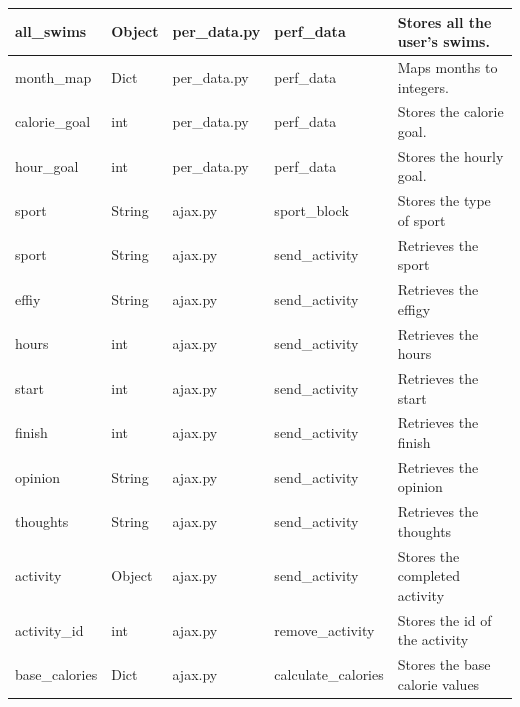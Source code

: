 \documentclass{article}[12pt,a4paper]
\begin{document}
\begin{table}[h]
\begin{tabular}{lllll}
all\_swims        & Object        & per\_data.py        & perf\_data              & Stores all the user's swims.            \\ \hline
month\_map        & Dict          & per\_data.py        & perf\_data              & Maps months to integers.                \\ \hline
calorie\_goal     & int           & per\_data.py        & perf\_data              & Stores the calorie goal.                \\ \hline
hour\_goal        & int           & per\_data.py        & perf\_data              & Stores the hourly goal.                 \\ \hline
sport             & String        & ajax.py             & sport\_block            & Stores the type of sport                \\ \hline
sport             & String        & ajax.py             & send\_activity          & Retrieves the sport                     \\ \hline
effiy             & String        & ajax.py             & send\_activity          & Retrieves the effigy                    \\ \hline
hours             & int           & ajax.py             & send\_activity          & Retrieves the hours                     \\ \hline
start             & int           & ajax.py             & send\_activity          & Retrieves the start                     \\ \hline
finish            & int           & ajax.py             & send\_activity          & Retrieves the finish                    \\ \hline
opinion           & String        & ajax.py             & send\_activity          & Retrieves the opinion                   \\ \hline
thoughts          & String        & ajax.py             & send\_activity          & Retrieves the thoughts                  \\ \hline
activity          & Object        & ajax.py             & send\_activity          & Stores the completed activity           \\ \hline
activity\_id      & int           & ajax.py             & remove\_activity        & Stores the id of the activity           \\ \hline
base\_calories    & Dict          & ajax.py             & calculate\_calories     & Stores the base calorie values          \\ \hline

\end{tabular}
\end{table}
\end{document}
